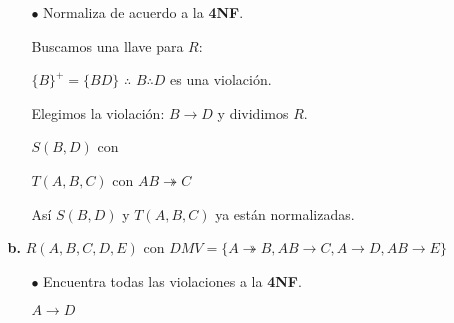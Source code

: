 \documentclass[12pt, letterpaper]{article}
\begin{document}
\begin{itemize}
\begin{itemize}
\begin{itemize}
                            \item[$\bullet$]    Normaliza de acuerdo a la 
                                                \textbf{4NF}. \vspace{.3cm}

                                                Buscamos una llave para $R$: \vspace{.1cm}

                                                $\{B\}^+=\{BD\}$ $\therefore$ $B \therefore D$ es una violación. \vspace{.3cm}

                                                Elegimos la violación: $B \rightarrow D$ y dividimos $R$. \vspace{.1cm}

                                                $S(B,D)$ con  \checkmark %

                                                $T(A,B,C)$ con \textbf{$AB \twoheadrightarrow C$} \checkmark %

                                                Así $S(B,D)$ y $T(A,B,C)$ ya están normalizadas. \vspace{.3cm}

                        \end{itemize} 

                    \item[\textbf{b.}]  $R(A,B,C,D,E)$ con $DMV = \{A \twoheadrightarrow B
                                        ,AB \rightarrow C,A \rightarrow D,AB \rightarrow E\}$
                                        
                        \begin{itemize}

                            \item[$\bullet$]    Encuentra todas las violaciones 
                                                a la \textbf{4NF}. \vspace{.1cm}

                                                \begin{center}
                                                    $A \rightarrow D$
                                                \end{center}


\end{itemize}
\end{itemize}
\end{itemize}
\end{document}
